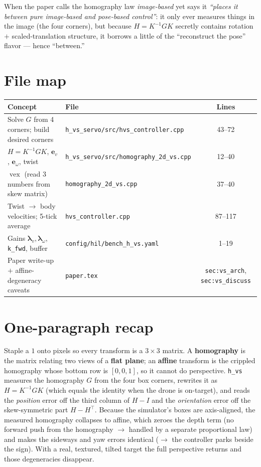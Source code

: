 \documentclass[11pt]{article}
\DeclareMathOperator{\vex}{vex}
\begin{document}
When the paper calls the homography law \emph{image-based} yet says it
\emph{``places it between pure image-based and pose-based control''}: it only
ever measures things in the image (the four corners), but because $H=K^{-1}GK$
secretly contains rotation $+$ scaled-translation structure, it borrows a little
of the ``reconstruct the pose'' flavor --- hence ``between.''

\section{File map}

\begin{center}
\renewcommand{\arraystretch}{1.3}
\begin{tabular}{@{}p{}p{}c@{}}
\toprule
Concept & File & Lines \\
\midrule
Solve $G$ from 4 corners; build desired corners & \texttt{h\_vs\_servo/src/hvs\_controller.cpp} & 43--72 \\
$H=K^{-1}GK$, $\mathbf{e}_v$, $\mathbf{e}_\omega$, twist & \texttt{h\_vs\_servo/src/homography\_2d\_vs.cpp} & 12--40 \\
$\vex$ (read 3 numbers from skew matrix) & \texttt{homography\_2d\_vs.cpp} & 37--40 \\
Twist $\to$ body velocities; 5-tick average & \texttt{hvs\_controller.cpp} & 87--117 \\
Gains $\boldsymbol{\lambda}_v,\boldsymbol{\lambda}_\omega$, \texttt{k\_fwd}, buffer & \texttt{config/hil/bench\_h\_vs.yaml} & 1--19 \\
Paper write-up $+$ affine-degeneracy caveats & \texttt{paper.tex} & \texttt{sec:vs\_arch}, \texttt{sec:vs\_discuss} \\
\bottomrule
\end{tabular}
\end{center}

\section{One-paragraph recap}

Staple a $1$ onto pixels so every transform is a $3\times3$ matrix. A
\textbf{homography} is the matrix relating two views of a \textbf{flat plane};
an \textbf{affine} transform is the crippled homography whose bottom row is
$[0,0,1]$, so it cannot do perspective. \texttt{h\_vs} measures the homography
$G$ from the four box corners, rewrites it as $H=K^{-1}GK$ (which equals the
identity when the drone is on-target), and reads the \emph{position} error off
the third column of $H-I$ and the \emph{orientation} error off the
skew-symmetric part $H-H^{\top}$. Because the simulator's boxes are
axis-aligned, the measured homography collapses to affine, which zeroes the
depth term (no forward push from the homography $\to$ handled by a separate
proportional law) and makes the sideways and yaw errors identical ($\to$ the
controller parks beside the sign). With a real, textured, tilted target the full
perspective returns and those degeneracies disappear.
\end{document}
